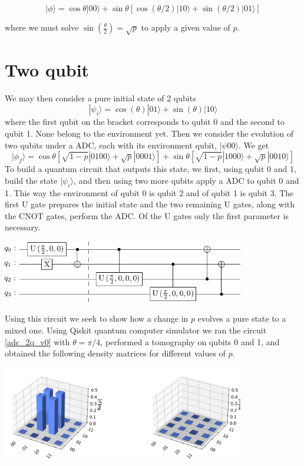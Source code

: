 \documentclass[a4paper, onecolumn]{article}
\begin{document}
		$$
		|\phi\rangle = \cos\theta|00\rangle + 
					   \sin\theta[\cos(\theta/2)|10\rangle + \sin(\theta/2)|01\rangle]
		$$
		
		where we must solve $\sin(\frac{\theta}{2}) = \sqrt{p}$ to apply a given value of $p$.

	\section{Two qubit}
		We may then consider a pure initial state of 2 qubits
		$$
		|\psi_i\rangle=\cos(\theta)|01\rangle + \sin(\theta)|10\rangle
		$$
		where the first qubit on the bracket corresponds to qubit 0 and the second to qubit 1. None belong to the environment yet. Then we consider the evolution of two qubits under a ADC, each with its environment qubit, $|\psi00\rangle$. We get
		$$
		|\phi_f\rangle=\cos \theta[\sqrt{1-p}|0100\rangle+\sqrt{p}|0001\rangle]+
		\sin \theta[\sqrt{1-p}|1000\rangle+\sqrt{p} |0010\rangle]
		$$
		To build a quantum circuit that outputs this state, we first, using qubit 0 and 1, build the state $|\psi_i\rangle$, and then using two more qubits apply a ADC to qubit 0 and 1. This way the environment of qubit 0 is qubit 2 and of qubit 1 is qubit 3. The first U gate prepares the initial state and the two remaining U gates, along with the CNOT gates, perform the ADC. Of the U gates only the first parameter is necessary.

		\begin{center}
			\includegraphics[width=300pt]{img/adc_2q_v0.png}
			\label{adc_2q_v0}
		\end{center}

		Using this circuit we seek to show how a change in $p$ evolves a pure state to a mixed one. Using Qiskit quantum computer simulator we ran the circuit \ref{adc_2q_v0} with $\theta = \pi / 4$, performed a tomography on qubits 0 and 1, and obtained the following density matrices for different values of $p$.

		\begin{center}
			\includegraphics[width=300pt]{img/dm_p0_v0.png}
			\label{dm_p0}
		\end{center}
\end{document}
